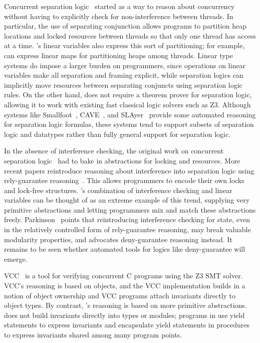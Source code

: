Concurrent separation logic~\cite{OHearn07} started as a way to reason about concurrency without having to explicitly check for non-interference between threads.
In particular, the use of separating conjunction allows programs to partition heap locations and locked resources between threads so that only one thread has access at a time.
\civl's linear variables also express this sort of partitioning; for example, \civl can express linear maps for partitioning heaps among threads.
Linear type systems do impose a larger burden on programmers, since operations on linear variables make all separation and framing explicit, while separation logics can implicitly move resources between separating conjuncts using separation logic rules.
On the other hand, \civl does not require a theorem prover for separation logic, allowing it to work with existing fast classical logic solvers such as Z3.
Although systems like Smallfoot~\cite{Smallfoot}, CAVE~\cite{Cave}, and SLAyer~\cite{Slayer} provide some automated reasoning for separation logic formulas, these systems tend to support subsets of separation logic and datatypes rather than fully general support for separation logic.

In the absence of interference checking, the original work on concurrent separation logic~\cite{OHearn07} had to bake in abstractions for locking and resources.
More recent papers reintroduce reasoning about interference into separation logic using rely-guarantee reasoning~\cite{SAGL,RGSep}.
This allows programmers to encode their own locks and lock-free structures.
\civl's combination of interference checking and linear variables can be thought of as an extreme example of this trend, supplying very primitive abstractions and letting programmers mix and match these abstractions freely.
Parkinson~\cite{SepLog700} points that reintroducing interference checking for state, even in the relatively controlled form of rely-guarantee reasoning, may break valuable modularity properties, and advocates deny-guarantee reasoning instead.
It remains to be seen whether automated tools for logics like deny-guarantee will emerge.

VCC~\cite{VCC} is a tool for verifying concurrent C programs using the Z3 SMT solver.  VCC's reasoning is based on objects, and the VCC implementation builds in a notion of object ownership and VCC programs attach invariants directly to object types.  By contrast, \civl's reasoning is based on more primitive abstractions.  \civl does not build invariants directly into types or modules; programs in \civl use yield statements to express invariants and encapsulate yield statements in procedures to express invariants shared among many program points.

